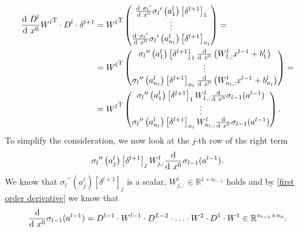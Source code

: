 \begin{align}
    \label{pervert differential}
    \frac{\textup{d} \ D^{l}}{\textup{d} \ x^0} {W^{l}}^{\mathrm{T}} \cdot D^{l} \cdot \delta^{l+1} & = {W^{l}}^{\mathrm{T}} \begin{pmatrix} \frac{\textup{d} \ {\sigma_{l}}^{\prime}}{\textup{d} \ x^0} {\sigma_{l}}^{\prime} \left( a^{l}_1 \right) \left[ \delta^{l+1} \right]_1 \\ \vdots \\ \frac{\textup{d} \ {\sigma_{l}}^{\prime}}{\textup{d} \ x^0} {\sigma_{l}}^{\prime} \left( a^{l}_{n_l} \right) \left[ \delta^{l+1} \right]_{n_l} \end{pmatrix} = \\
    & = {W^{l}}^{\mathrm{T}} \begin{pmatrix} {\sigma_{l}}^{\prime \prime} \left( a^{l}_1 \right) \left[ \delta^{l+1} \right]_1 \frac{\textup{d}}{\textup{d} \ x^0} \left( W^{l}_{1,:} x^{l-1} + b^l_{1} \right) \\ \vdots \\ {\sigma_{l}}^{\prime \prime} \left( a^{l}_{n_l} \right) \left[ \delta^{l+1} \right]_{n_l} \frac{\textup{d}}{\textup{d} \ x^0} \left( W^{l}_{n_l,:} x^{l-1} + b^l_{n_l} \right) \end{pmatrix} = \\
    & = {W^{l}}^{\mathrm{T}} \begin{pmatrix} {\sigma_{l}}^{\prime \prime} \left( a^{l}_1 \right) \left[ \delta^{l+1} \right]_1 W^{l}_{1,:} \frac{\textup{d}}{\textup{d} \ x^0} \sigma_{l-1}(a^{l-1})\\ \vdots \\ {\sigma_{l}}^{\prime \prime} \left( a^{l}_{n_l} \right) \left[ \delta^{l+1} \right]_{n_l}  W^{l}_{n_l,:} \frac{\textup{d}}{\textup{d} \ x^0} \sigma_{l-1}(a^{l-1}) \end{pmatrix}.
\end{align}
To simplify the consideration, we now look at the $j$-th row of the right term
\begin{equation}
    \label{ith row differential}
    {\sigma_{l}}^{\prime \prime} \left( a^{l}_{j} \right) \left[ \delta^{l+1} \right]_{j}  W^{l}_{j,:} \frac{\textup{d}}{\textup{d} \ x^0} \sigma_{l-1}(a^{l-1}).
\end{equation}
We know that ${\sigma_{l}}^{\prime \prime} \left( a^{l}_{j} \right) \left[ \delta^{l+1} \right]_{j}$ is a scalar, $W^{l}_{j,:} \in \mathbb{R}^{1 \times n_{l-1}}$ holds and by \cref{first order derivative} we know that
\begin{equation}
    \label{ith row differential 2}
    \frac{\textup{d}}{\textup{d} \ x^0} \sigma_{l-1}(a^{l-1}) = D^{l-1} \cdot W^{l-1} \cdot D^{L-2} \cdot \ldots \cdot W^2 \cdot D^1 \cdot W^{1} \in \mathbb{R}^{n_{l-1} \times n_0}.
\end{equation}

